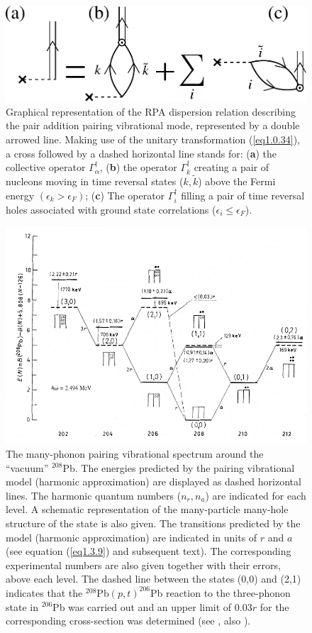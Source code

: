 \begin{figure}
	\centerline {
		\includegraphics*[width=12cm]{introduccion/figs/fig_preface_3_1}
	}
	\caption{Graphical representation of the RPA dispersion relation describing the pair addition pairing vibrational mode, represented by a double arrowed line. Making use of the unitary transformation (\ref{eq1.0.34}), a cross followed by a dashed horizontal line stands for: (\textbf{a}) the collective operator $\Gamma_\alpha^\dagger$, (\textbf{b}) the operator $\Gamma_k^\dagger$ creating a pair of nucleons moving in time reversal states ($k,\tilde k$) above the Fermi energy $(\epsilon_k>\epsilon_F)$; (\textbf{c}) The operator $\Gamma^\dagger_i$ filling a pair of time reversal holes associated with ground state correlations ($\epsilon_i\leq\epsilon_F$).}
	\label{fig0.3.1}
\end{figure}
\begin{figure}
	\centerline {
		\includegraphics*[width=15cm, angle=0.]{introduccion/figs/fig1_3_2}
	}
	\caption{The many-phonon pairing vibrational spectrum around the ``vacuum'' $^{208}$Pb. The energies predicted by the pairing vibrational model (harmonic approximation) are displayed as dashed horizontal lines. The harmonic quantum numbers ($n_r,n_a$) are indicated for each level. A schematic representation of the many-particle many-hole structure of the state is also given. The transitions predicted by the model (harmonic approximation) are indicated in units of $r$ and $a$ (see equation (\ref{eq1.3.9}) and subsequent text). The corresponding experimental numbers are also given together with their errors, above each level. The dashed line between the states (0,0) and (2,1) indicates that the $^{208}$Pb$(p,t)^{206}$Pb reaction to the three-phonon state in $^{206}$Pb was carried out and an upper limit of 0.03$r$ for the corresponding cross-section was determined (see \cite{Flynn:72} \cite{Broglia:73}, also \cite{Lanford:73}).}
	\label{fig0.3.2}
\end{figure}

